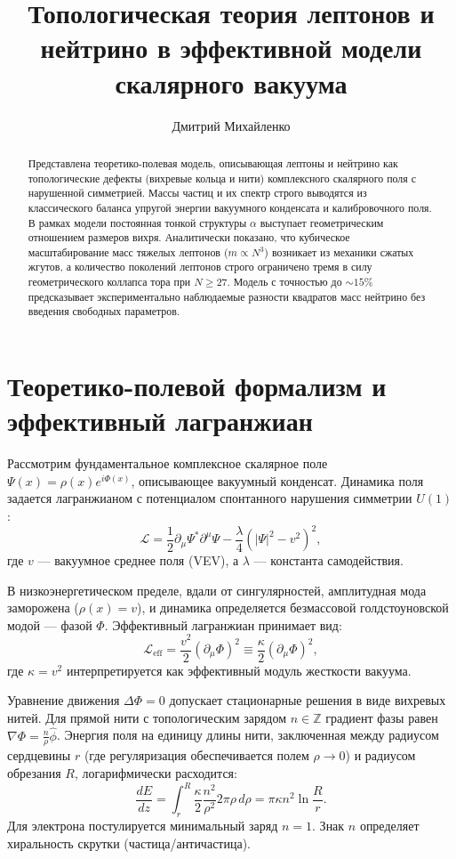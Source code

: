 \documentclass[12pt,a4paper]{article}
\title{Топологическая теория лептонов и нейтрино в эффективной модели скалярного вакуума}
\author{Дмитрий Михайленко}
\date{}
\begin{document}
\maketitle

\begin{abstract}
Представлена теоретико-полевая модель, описывающая лептоны и нейтрино как топологические дефекты (вихревые кольца и нити) комплексного скалярного поля с нарушенной симметрией. Массы частиц и их спектр строго выводятся из классического баланса упругой энергии вакуумного конденсата и калибровочного поля. В рамках модели постоянная тонкой структуры $\alpha$ выступает геометрическим отношением размеров вихря. Аналитически показано, что кубическое масштабирование масс тяжелых лептонов ($m \propto N^3$) возникает из механики сжатых жгутов, а количество поколений лептонов строго ограничено тремя в силу геометрического коллапса тора при $N \ge 27$. Модель с точностью до $\sim 15\%$ предсказывает экспериментально наблюдаемые разности квадратов масс нейтрино без введения свободных параметров.
\end{abstract}

\section{Теоретико-полевой формализм и эффективный лагранжиан}

Рассмотрим фундаментальное комплексное скалярное поле $\Psi(x) = \rho(x) e^{i\Phi(x)}$, описывающее вакуумный конденсат. Динамика поля задается лагранжианом с потенциалом спонтанного нарушения симметрии $U(1)$:
\begin{equation}
\mathcal{L} = \frac{1}{2} \partial_\mu \Psi^* \partial^\mu \Psi - \frac{\lambda}{4} (|\Psi|^2 - v^2)^2,
\label{eq:fundamental_lagrangian}
\end{equation}
где $v$ — вакуумное среднее поля (VEV), а $\lambda$ — константа самодействия.

В низкоэнергетическом пределе, вдали от сингулярностей, амплитудная мода заморожена ($\rho(x) = v$), и динамика определяется безмассовой голдстоуновской модой — фазой $\Phi$. Эффективный лагранжиан принимает вид:
\begin{equation}
\mathcal{L}_{\text{eff}} = \frac{v^2}{2} (\partial_\mu \Phi)^2 \equiv \frac{\kappa}{2} (\partial_\mu \Phi)^2,
\label{eq:effective_lagrangian}
\end{equation}
где $\kappa = v^2$ интерпретируется как эффективный модуль жесткости вакуума.

Уравнение движения $\Delta\Phi = 0$ допускает стационарные решения в виде вихревых нитей. Для прямой нити с топологическим зарядом $n \in \mathbb{Z}$ градиент фазы равен $\nabla\Phi = \frac{n}{\rho} \hat{\phi}$. Энергия поля на единицу длины нити, заключенная между радиусом сердцевины $r$ (где регуляризация обеспечивается полем $\rho \to 0$) и радиусом обрезания $R$, логарифмически расходится:
\begin{equation}
\frac{dE}{dz} = \int_{r}^{R} \frac{\kappa}{2} \frac{n^2}{\rho^2} 2\pi\rho \, d\rho = \pi \kappa n^2 \ln\frac{R}{r}.
\label{eq:energy_density}
\end{equation}
Для электрона постулируется минимальный заряд $n = 1$. Знак $n$ определяет хиральность скрутки (частица/античастица).
\end{document}
